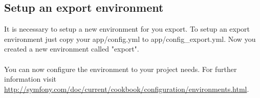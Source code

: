 \subsection{Setup an export environment}

It is necessary to setup a new environment for you export. To setup an export environment just copy your app/config.yml to app/config\_export.yml. Now you created a new environment called "export". \\
\\
You can now configure the environment to your project needs. For further information visit \url{http://symfony.com/doc/current/cookbook/configuration/environments.html}.\\
